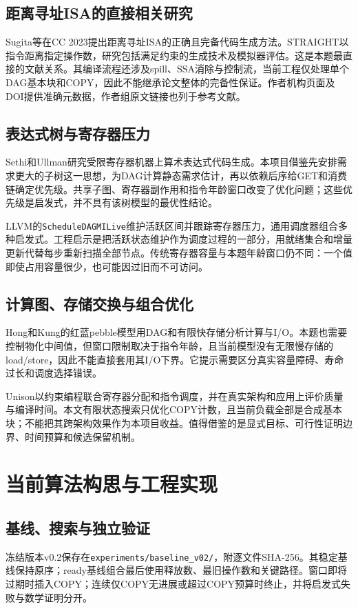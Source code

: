 \documentclass[UTF8,11pt,fontset=fandol]{ctexart}
\begin{document}
\subsection{距离寻址ISA的直接相关研究}
Sugita等在CC 2023提出距离寻址ISA的正确且完备代码生成方法\cite{sugita}。STRAIGHT以指令距离指定操作数，研究包括满足约束的生成技术及模拟器评估。这是本题最直接的文献关系。其编译流程还涉及spill、SSA消除与控制流，当前工程仅处理单个DAG基本块和COPY，因此不能继承论文整体的完备性保证。作者机构页面及DOI提供准确元数据，作者组原文链接也列于参考文献。

\subsection{表达式树与寄存器压力}
Sethi和Ullman研究受限寄存器机器上算术表达式代码生成\cite{sethi}。本项目借鉴先安排需求更大的子树这一思想，为DAG计算静态需求估计，再以依赖后序给GET和消费链确定优先级。共享子图、寄存器副作用和指令年龄窗口改变了优化问题；这些优先级是启发式，并不具有该树模型的最优性结论。

LLVM的\texttt{ScheduleDAGMILive}维护活跃区间并跟踪寄存器压力，通用调度器组合多种启发式\cite{llvm}。工程启示是把活跃状态维护作为调度过程的一部分，用就绪集合和增量更新代替每步重新扫描全部节点。传统寄存器容量与本题年龄窗口仍不同：一个值即使占用容量很少，也可能因过旧而不可访问。

\subsection{计算图、存储交换与组合优化}
Hong和Kung的红蓝pebble模型用DAG和有限快存储分析计算与I/O\cite{hong}。本题也需要控制物化中间值，但窗口限制取决于指令年龄，且当前模型没有无限慢存储的load/store，因此不能直接套用其I/O下界。它提示需要区分真实容量障碍、寿命过长和调度选择错误。

Unison以约束编程联合寄存器分配和指令调度，并在真实架构和应用上评价质量与编译时间\cite{unison}。本文有限状态搜索只优化COPY计数，且当前负载全部是合成基本块；不能把其跨架构效果作为本项目收益。值得借鉴的是显式目标、可行性证明边界、时间预算和候选保留机制。

\section{当前算法构思与工程实现}
\subsection{基线、搜索与独立验证}
冻结版本v0.2保存在\texttt{experiments/baseline\_v02/}，附逐文件SHA-256。其稳定基线保持原序；ready基线组合最后使用释放数、最旧操作数和关键路径。窗口即将过期时插入COPY；连续仅COPY无进展或超过COPY预算时终止，并将启发式失败与数学证明分开。
\end{document}
